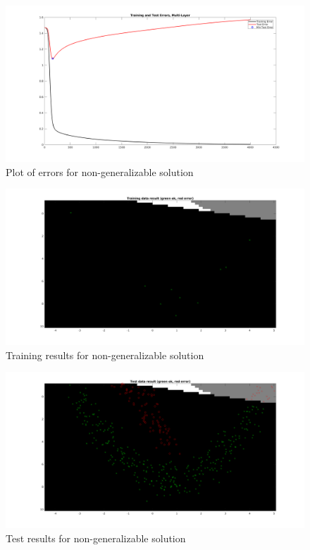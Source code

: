 \documentclass{article}
\begin{document}
\begin{figure}[h!]
    \includegraphics[width=13cm]{errornongen.png}
    \caption{Plot of errors for non-generalizable solution}
    \label{fig:errornongen}
\end{figure}

\begin{figure}[h!]
    \includegraphics[width=13cm]{trainingresnongen.png}
    \caption{Training results for non-generalizable solution}
    \label{fig:trainnongen}
\end{figure}

\begin{figure}[h!]
    \includegraphics[width=13cm]{testresnongen.png}
    \caption{Test results for non-generalizable solution}
    \label{fig:testnongen}
\end{figure}
\end{document}
